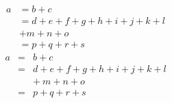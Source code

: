 \documentclass{article}
\begin{document}
\begin{align}
 a & = b + c \\
   & = d + e + f + g + h + i + j + k + l \nonumber \\
   & + m + n + o \\
   & = p + q + r + s
\end{align}
\begin{eqnarray}
 a & = & b + c \\
   & = & d + e + f + g + h + i 
   + j + k + l \nonumber \\
   && +\: m + n + o \\
   & = & p + q + r + s
\end{eqnarray}
\end{document}
